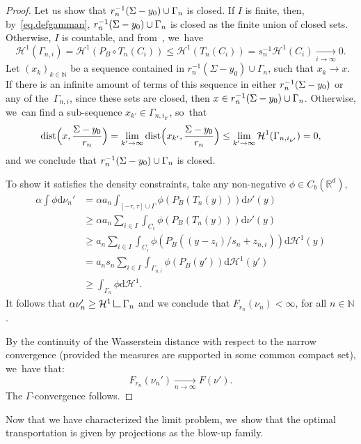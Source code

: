 \documentclass[11pt]{article}
\numberwithin{equation}{section}
\theoremstyle{definition}
\newcommand\LM[1]{\hbox{\vrule width.5pt \vbox to#1pt{\vfill \hrule width#1pt height.5pt}}}
\newcommand\LL{{\mathchoice {\>\LM7\>}{\>\LM7\>}{\,\LM5\,}{\,\LM{3.35}\,}}}
\newcommand{\mres}{\LL}
\newcommand\cH{\mathcal{H}}
\newcommand{\RR}{\mathbb{R}}
\DeclareMathOperator{\dist}{dist}
\newcommand\dd{\mathrm{d}}
\begin{document}
\begin{proof}
Let us show that $r_n^{-1}(\Sigma -\nobreak y_0) \cup\nobreak \Gamma_n$ is closed. If $I$ is finite, then, by~\eqref{eq.defgamman}, $r_n^{-1}(\Sigma -\nobreak y_0) \cup\nobreak \Gamma_n$ is closed as the finite union of closed sets.
Otherwise, $I$ is countable, and from~\cite[Lem.\,2.6]{paolini2013existence}, we~have
\[
\cH^1(\Gamma_{n,i})
=
\cH^1(P_B\circ T_n(C_i))
\le
\cH^1(T_n(C_i))
=
s_n^{-1} \cH^1(C_i)
\xrightarrow[i \to \infty]{} 0.
\]
Let ${\left(x_k\right)}_{k \in \mathbb{N}}$ be a sequence contained in $r_n^{-1}(\Sigma - y_0) \cup \Gamma_n$, such that $x_k \to x$. If there is an infinite amount of terms of this sequence in either $r_n^{-1}(\Sigma -\nobreak y_0)$ or any of the~$\Gamma_{n,i}$, since these sets are closed, then $x \in r_n^{-1}(\Sigma -\nobreak y_0) \cup\nobreak \Gamma_n$. Otherwise, we~can find a sub-sequence $x_{k'} \in \Gamma_{n, i_{k'}}$, so~that
\[
\dist\Bigl(
x, \frac{\Sigma - y_0}{r_n}
\Bigr)
=
\lim_{k' \to \infty}
\dist \Bigl(
x_{k'}, \frac{\Sigma - y_0}{r_n}
\Bigr)
\le
\lim_{k' \to \infty} \cH^1(\Gamma_{n,i_{k'}}) = 0,
\]
and we conclude that $r_n^{-1}(\Sigma -\nobreak y_0) \cup\nobreak \Gamma_n$ is closed.

To show it satisfies the density constraints, take any non-negative $\phi\in C_b(\RR^d)$,
\begin{align*}
\alpha\int\phi\dd \nu_n'
&= \alpha a_n\int_{[-\tau,\tau]\cup \Gamma}\phi\left(P_B(T_n(y))\right)\dd \nu'(y)\\
&\ge \alpha a_n\sum_{i\in I}\int_{C_{i}}\phi\left(P_B(T_n(y))\right)\dd \nu'(y)\\
&\ge a_n\sum_{i\in I}\int_{C_{i}}\phi\left(P_B((y-z_{i})/s_{n}+z_{n,i})\right)\dd \cH^{1}(y)\\
&= a_n s_{n}\sum_{i\in I}\int_{\Gamma_{n,i}}\phi\left(P_B(y')\right)\dd \cH^{1}(y')\\
&
\ge \int_{\Gamma_{n}} \phi \dd \cH^{1}.
\end{align*}
It follows that $\alpha \nu_n'\geq \cH^1\mres \Gamma_{n}$ and we conclude that $F_{r_n}(\nu_n) < \infty$, for all $n \in \mathbb{N}$.

By the continuity of the Wasserstein distance with
respect to the narrow convergence (provided the measures are supported in some common compact set), we~have that:
\[
F_{r_n}(\nu_n') \xrightarrow[n \to \infty]{} F(\nu').
\]
The $\Gamma$-convergence follows.
\end{proof}

Now that we have characterized the limit problem, we~show that the optimal transportation is given by projections as the blow-up family.
\end{document}
